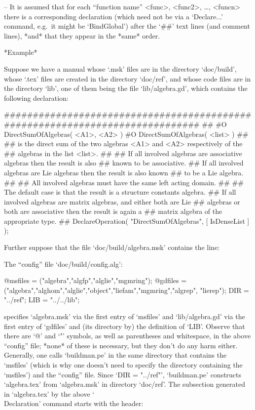 \item{--}
It is assumed that for each ``function  name''  <func>,  <func2>,  \dots,
<funcn> there is a corresponding {\GAP} declaration (which  need  not  be
via a `Declare...' command, e.g.~it  might  be  `BindGlobal')  after  the
`\#\#' text lines (and comment lines), *and*  that  they  appear  in  the
*same* order.

\endlist

\goodbreak%

*Example*

Suppose we have a manual whose `.msk' files are in the directory `doc/build',
whose `.tex' files are created in the directory `doc/ref',
and whose {\GAP} code files are in the directory `lib',
one of them being the file `lib/algebra.gd',
which contains the following declaration:

\begintt
#############################################################################
##
#O  DirectSumOfAlgebras( <A1>, <A2> )
#O  DirectSumOfAlgebras( <list> )
##
##  is the direct sum of the two algebras <A1> and <A2> respectively of the
##  algebras in the list <list>.
##
##  If all involved algebras are associative algebras then the result is also
##  known to be associative.
##  If all involved algebras are Lie algebras then the result is also known
##  to be a Lie algebra.
##
##  All involved algebras must have the same left acting domain.
##
##  The default case is that the result is a structure constants algebra.
##  If all involved algebras are matrix algebras, and either both are Lie
##  algebras or both are associative then the result is again a
##  matrix algebra of the appropriate type.
##
DeclareOperation( "DirectSumOfAlgebras", [ IsDenseList ] );
\endtt

Further suppose that the file `doc/build/algebra.msk' contains the line:

\begintt
{}
\endtt

The ``config'' file `doc/build/config.alg':

\begintt
@msfiles = ("algebra","algfp","alglie","mgmring");
@gdfiles = ("algebra","alghom","alglie","object","liefam","mgmring","algrep",
            "lierep");
DIR = "../ref";
LIB = "../../lib";
\endtt

specifies  `algebra.msk'  via  the   first   entry   of   `msfiles'   and
`lib/algebra.gd' via the first entry of `gdfiles' and (its directory  by)
the definition of `LIB'. Observe that there are `@' and `"'  symbols,  as
well as parentheses and whitespace, in the above ``config'' file;  *none*
of these is necessary, but they don't do any harm either. Generally,  one
calls `buildman.pe' in the same directory  that  contains  the  `msfiles'
(which is why one doesn't need to specify the  directory  containing  the
`msfiles') and the ``config'' file. Since `DIR = "../ref"', `buildman.pe'
constructs `algebra.tex' from `algebra.msk' in directory  `doc/ref'.  The
subsection  generated  in  `algebra.tex'  by  the  above  `\\Declaration'
command starts with the header:

